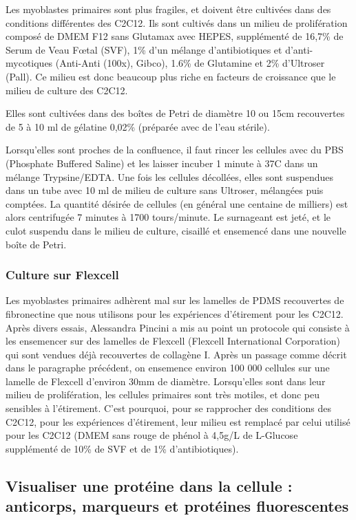 	Les myoblastes primaires sont plus fragiles, et doivent être cultivées dans des conditions différentes des C2C12. Ils sont cultivés dans un milieu de prolifération composé de DMEM F12 sans Glutamax avec HEPES, supplémenté de 16,7\% de Serum de Veau F\oe tal (SVF), 1\% d'un mélange d'antibiotiques et d'anti-mycotiques (Anti-Anti (100x), Gibco), 1.6\% de Glutamine et 2\% d'Ultroser (Pall). Ce milieu est donc beaucoup plus riche en facteurs de croissance que le milieu de culture des C2C12. 

	
	Elles sont cultivées dans des boîtes de Petri de diamètre 10 ou 15cm recouvertes de 5 à 10 ml de gélatine 0,02\% (préparée avec de l'eau stérile).
	
	Lorsqu'elles sont proches de la confluence, il faut rincer les cellules avec du PBS (Phosphate Buffered Saline) et les laisser incuber 1 minute à 37\degres   C dans un mélange Trypsine/EDTA. Une fois les cellules décollées, elles sont suspendues dans un tube avec 10 ml de milieu de culture sans Ultroser, mélangées puis comptées. La quantité désirée de cellules (en général une centaine de milliers) est alors centrifugée 7  minutes à 1700 tours/minute. Le surnageant est jeté, et le culot suspendu dans le milieu de culture, cisaillé et ensemencé dans une nouvelle boîte de Petri. 
	
	\subsubsection{Culture sur Flexcell}
	
	Les myoblastes primaires adhèrent mal sur les lamelles de PDMS recouvertes de fibronectine que nous utilisons pour les expériences d’étirement pour les C2C12. Après divers essais, Alessandra Pincini a mis au point un protocole qui consiste à les ensemencer sur des lamelles de Flexcell (Flexcell International Corporation) qui sont vendues déjà recouvertes de collagène I. Après un passage comme décrit dans le paragraphe précédent, on ensemence environ 100 000 cellules sur une lamelle de Flexcell d’environ 30mm de diamètre. 
	Lorsqu'elles sont dans leur milieu de prolifération, les cellules primaires sont très motiles, et donc peu sensibles à l'étirement. C'est pourquoi, pour se rapprocher des conditions des C2C12, pour les expériences d’étirement, leur milieu est remplacé par celui utilisé pour les C2C12 (DMEM sans rouge de phénol à 4,5g/L de L-Glucose supplémenté de 10\% de SVF et de 1\% d'antibiotiques). 
	
	\subsection{Visualiser une protéine dans la cellule : anticorps, marqueurs et protéines fluorescentes}
	
